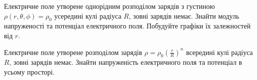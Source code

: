 
\begin{problem}
Електричне поле утворене однорідним розподілом зарядів з густиною $\rho(r,\theta,\phi) = \rho_0$ усередині кулі радіуса $R$, зовні зарядів немає. Знайти модуль напруженості та потенціал електричного поля. Побудуйте графіки їх залежностей від $r$.
\end{problem}


\begin{problem}
Електричне поле утворене розподілом зарядів $\rho = \rho_0\left( \frac{r}{R}\right)^n $   всередині кулі радіуса $R$, зовні зарядів немає. Знайти напруженість електричного поля та потенціал в усьому просторі.
\end{problem}


